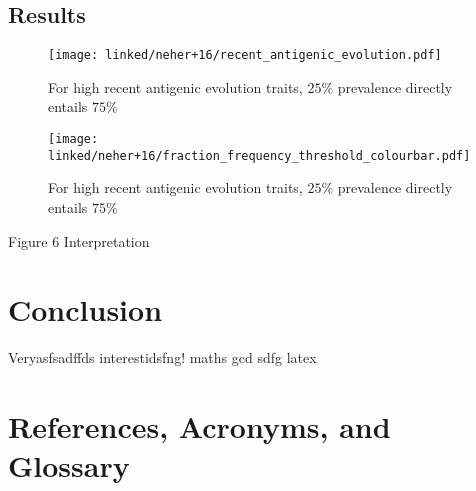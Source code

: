 \documentclass[12pt]{scrartcl}
\begin{document}
  \subsection{Results}

  \begin{figure}[h!]
    \texttt{[image: linked/neher+16/recent\_antigenic\_evolution.pdf]}
    \caption{\footnotesize For high recent antigenic evolution traits, $25\%$ prevalence directly entails $75\%$ \cite{neherBedford+16}}
  \end{figure}

  \begin{figure}[h!]
    \texttt{[image: linked/neher+16/fraction\_frequency\_threshold\_colourbar.pdf]}
    \caption{\footnotesize For high recent antigenic evolution traits, $25\%$ prevalence directly entails $75\%$ \cite{neherBedford+16}}
  \end{figure}

    Figure 6 Interpretation

\section{Conclusion}

  Veryasfsadffds interestidsfng! \gls{maths} \acrfull{gcd} sdfg \gls{latex}

\clearpage


\section{References, Acronyms, and Glossary}





\printglossary[type=\acronymtype]

\printglossary

% 

% 


\end{document}

